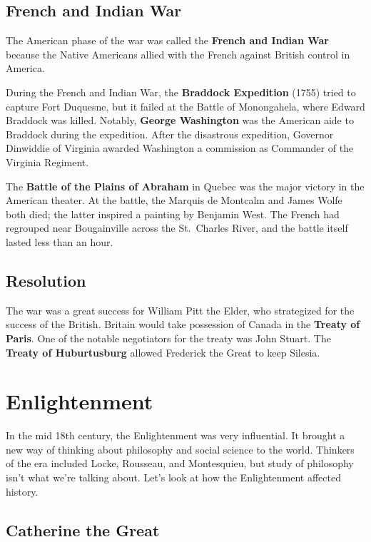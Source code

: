 \subsection*{French and Indian War}

The American phase of the war was called the \textbf{French and Indian War}
because the Native Americans allied with the French against British control in America.

During the French and Indian War, the \textbf{Braddock Expedition} (1755) tried to capture Fort Duquesne,
but it failed at the Battle of Monongahela, where Edward Braddock was killed.
Notably, \textbf{George Washington} was the American aide to Braddock during the expedition.
After the disastrous expedition,
Governor Dinwiddie of Virginia awarded Washington a commission as Commander of the Virginia Regiment.

The \textbf{Battle of the Plains of Abraham} in Quebec was the major victory in the American theater.
At the battle, the Marquis de Montcalm and James Wolfe both died; the latter inspired a painting by Benjamin West.
The French had regrouped near Bougainville across the St.\ Charles River,
and the battle itself lasted less than an hour.

\subsection*{Resolution}

The war was a great success for William Pitt the Elder, who strategized for the success of the British.
Britain would take possession of Canada in the \textbf{Treaty of Paris}.
One of the notable negotiators for the treaty was John Stuart.
The \textbf{Treaty of Huburtusburg} allowed Frederick the Great to keep Silesia.

\section{Enlightenment}

In the mid 18th century, the Enlightenment was very influential.
It brought a new way of thinking about philosophy and social science to the world.
Thinkers of the era included Locke, Rousseau, and Montesquieu,
but study of philosophy isn't what we're talking about.
Let's look at how the Enlightenment affected history.

\subsection*{Catherine the Great}

